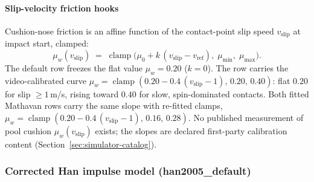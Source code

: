 \paragraph{Slip-velocity friction hooks} Cushion-nose
friction is an affine function of the contact-point slip speed
$v_{\mathrm{slip}}$ at impact start, clamped:
\begin{equation}
\mu_w(v_{\mathrm{slip}}) \;=\; \operatorname{clamp}\bigl(\mu_0 +
k\,(v_{\mathrm{slip}} - v_{\mathrm{ref}}),\; \mu_{\min},\;
\mu_{\max}\bigr).
\label{eq:muw-hook}
\end{equation}
The default row  freezes the flat value
$\mu_w = 0.20$ ($k = 0$). The  row carries the
video-calibrated curve $\mu_w = \operatorname{clamp}(0.20 -
0.4\,(v_{\mathrm{slip}} - 1),\, 0.20,\, 0.40)$: flat $0.20$ for slip
$\ge 1$\,m/s, rising toward $0.40$ for slow, spin-dominated contacts.
Both fitted Mathavan rows carry the same slope with re-fitted clamps,
$\mu_w = \operatorname{clamp}(0.20 - 0.4\,(v_{\mathrm{slip}} - 1),\,
0.16,\, 0.28)$. No published measurement of pool cushion
$\mu_w(v_{\mathrm{slip}})$ exists; the slopes are declared first-party
calibration content (Section~\ref{sec:simulator-catalog}).

\subsubsection{Corrected Han impulse model (han2005\_default)}
\label{sec:appendix-eq-han}

